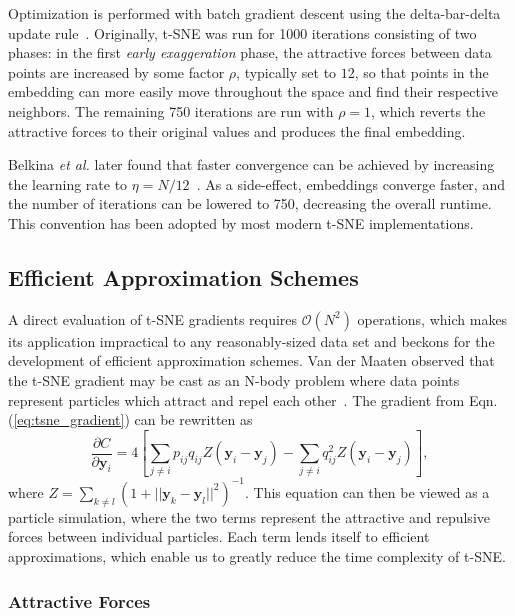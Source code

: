 \documentclass[twocolumn]{article}
\begin{document}
Optimization is performed with batch gradient descent using the delta-bar-delta
update rule~\cite{jacobs1988increased}. Originally, t-SNE was run for 1000
iterations consisting of two phases: in the first \textit{early exaggeration}
phase, the attractive forces between data points are increased by some factor
$\rho$, typically set to $12$, so that points in the embedding can more easily
move throughout the space and find their respective neighbors. The remaining 750
iterations are run with $\rho=1$, which reverts the attractive forces to their
original values and produces the final embedding.

Belkina \textit{et al.} later found that faster convergence can be achieved by
increasing the learning rate to $\eta=N/12$~\cite{belkina2019automated}. As a
side-effect, embeddings converge faster, and the number of iterations can be
lowered to 750, decreasing the overall runtime.  This convention has been
adopted by most modern t-SNE implementations.

\subsection*{Efficient Approximation Schemes} A direct evaluation of t-SNE
gradients requires $\mathcal{O}(N^2)$ operations, which makes its application
impractical to any reasonably-sized data set and beckons for the development of
efficient approximation schemes. Van der Maaten observed that the t-SNE gradient
may be cast as an N-body problem where data points represent particles which
attract and repel each other~\cite{van2014accelerating}. The gradient from Eqn.
(\ref{eq:tsne_gradient}) can be rewritten as
\begin{equation}
\frac{\partial C}{\partial \mathbf{y}_i} = 4 \left [ \sum_{j \neq i} p_{ij} q_{ij} Z \left ( \mathbf{y}_i - \mathbf{y}_j \right ) -\sum_{j \neq i} q_{ij}^2 Z \left ( \mathbf{y}_i - \mathbf{y}_j \right ) \right ], \label{eq:grad_attr_rep}
\end{equation}
where $Z = \sum_{k \neq l}\left ( 1 + || \mathbf{y}_k - \mathbf{y}_l ||^2 \right
)^{-1}$. This equation can then be viewed as a particle simulation, where the
two terms represent the attractive and repulsive forces between individual
particles. Each term lends itself to efficient approximations, which enable us
to greatly reduce the time complexity of t-SNE.

\subsubsection*{Attractive Forces}
\end{document}
